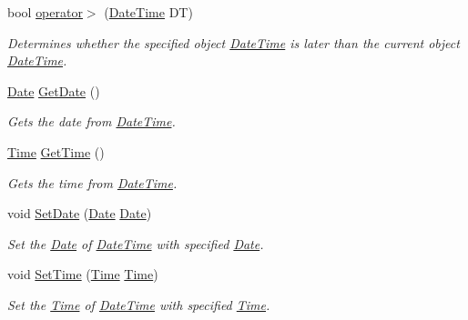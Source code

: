 \begin{DoxyCompactItemize}
bool \hyperlink{class_date_time_a0ebaa48c3c3c55751f3201c29379664e}{operator$>$} (\hyperlink{class_date_time}{Date\-Time} D\-T)
\begin{DoxyCompactList}\small\item\em Determines whether the specified object \hyperlink{class_date_time}{Date\-Time} is later than the current object \hyperlink{class_date_time}{Date\-Time}. \end{DoxyCompactList}\item 
\hyperlink{class_date}{Date} \hyperlink{class_date_time_a4c206227fdf530b862f4df46ee0da5b7}{Get\-Date} ()
\begin{DoxyCompactList}\small\item\em Gets the date from \hyperlink{class_date_time}{Date\-Time}. \end{DoxyCompactList}\item 
\hyperlink{class_time}{Time} \hyperlink{class_date_time_ab0b5363b639394082b8464107b96ef9c}{Get\-Time} ()
\begin{DoxyCompactList}\small\item\em Gets the time from \hyperlink{class_date_time}{Date\-Time}. \end{DoxyCompactList}\item 
void \hyperlink{class_date_time_af59006af64ac325b50d5d8c1dc6057b6}{Set\-Date} (\hyperlink{class_date}{Date} \hyperlink{class_date}{Date})
\begin{DoxyCompactList}\small\item\em Set the \hyperlink{class_date}{Date} of \hyperlink{class_date_time}{Date\-Time} with specified \hyperlink{class_date}{Date}. \end{DoxyCompactList}\item 
void \hyperlink{class_date_time_a59940dc8f5f4f7d938e2bdbe3b68eba2}{Set\-Time} (\hyperlink{class_time}{Time} \hyperlink{class_time}{Time})
\begin{DoxyCompactList}\small\item\em Set the \hyperlink{class_time}{Time} of \hyperlink{class_date_time}{Date\-Time} with specified \hyperlink{class_time}{Time}. \end{DoxyCompactList}\end{DoxyCompactItemize}
